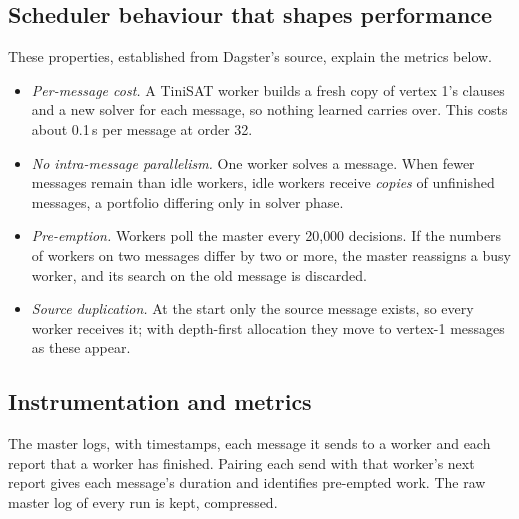 \documentclass[11pt,a4paper]{article}
\theoremstyle{definition}
\begin{document}
\subsection{Scheduler behaviour that shapes performance}

These properties, established from Dagster's source, explain the metrics below.
\begin{itemize}
\item \emph{Per-message cost.} A TiniSAT worker builds a fresh copy of vertex 1's clauses and a
new solver for each message, so nothing learned carries over. This costs about 0.1\,s per
message at order 32.
\item \emph{No intra-message parallelism.} One worker solves a message. When fewer messages
remain than idle workers, idle workers receive \emph{copies} of unfinished messages, a
portfolio differing only in solver phase.
\item \emph{Pre-emption.} Workers poll the master every 20{,}000 decisions. If the numbers of
workers on two messages differ by two or more, the master reassigns a busy worker, and its
search on the old message is discarded.
\item \emph{Source duplication.} At the start only the source message exists, so every worker
receives it; with depth-first allocation they move to vertex-1 messages as these appear.
\end{itemize}

\subsection{Instrumentation and metrics}

The master logs, with timestamps, each message it sends to a worker and each report that a
worker has finished. Pairing each send with that worker's next report gives each message's
duration and identifies pre-empted work. The raw master log of every run is kept, compressed.
\end{document}
